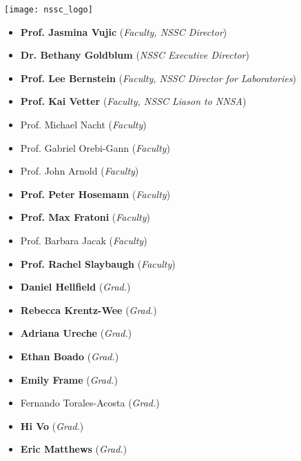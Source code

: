 \begin{minipage}{0.2\textwidth}
	\begin{center}
		\texttt{[image: nssc\_logo]}
	\end{center}
\end{minipage}
\hfill
\begin{minipage}{0.8\textwidth}
	\vspace{1cm}{\Large Members from UC Berkeley}\vspace{0.5cm}

	\newcommand{\nsscmember}[2]{#1 (\textit{#2})}
	\newcommand{\nensscmember}[2]{\nsscmember{\textbf{#1}}{#2}}
	\begin{itemize}
		\item \nensscmember{Prof. Jasmina Vujic}{Faculty, NSSC Director}
		\item \nensscmember{Dr. Bethany Goldblum}{NSSC Executive Director}
		\item \nensscmember{Prof. Lee Bernstein}{Faculty, NSSC Director for Laboratories}
		\item \nensscmember{Prof. Kai Vetter}{Faculty, NSSC Liason to NNSA}
		\item \nsscmember{Prof. Michael Nacht}{Faculty}
		\item \nsscmember{Prof. Gabriel Orebi-Gann}{Faculty}
		\item \nsscmember{Prof. John Arnold}{Faculty}
		\item \nensscmember{Prof. Peter Hosemann}{Faculty}
		\item \nensscmember{Prof. Max Fratoni}{Faculty}
		\item \nsscmember{Prof. Barbara Jacak}{Faculty}
		\item \nensscmember{Prof. Rachel Slaybaugh}{Faculty}
	\end{itemize}
	\begin{multicols}{2}
		\begin{itemize}
			\item \nensscmember{Daniel Hellfield}{Grad.}
			\item \nensscmember{Rebecca Krentz-Wee}{Grad.}
			\item \nensscmember{Adriana Ureche}{Grad.}
			\item \nensscmember{Ethan Boado}{Grad.}
			\item \nensscmember{Emily Frame}{Grad.}
			\item \nsscmember{Fernando Torales-Acosta}{Grad.}
			\item \nensscmember{Hi Vo}{Grad.}
			\item \nensscmember{Eric Matthews}{Grad.}

\end{itemize}
\end{multicols}
\end{minipage}
